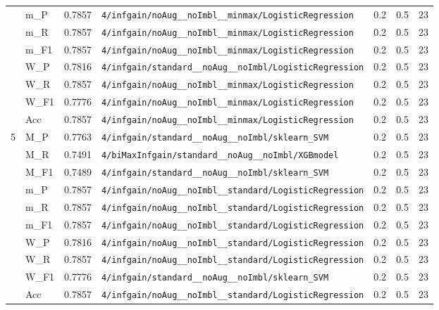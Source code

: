 \begin{table}[htbp]
\begin{tabular}{|c|l|c|>{\ttfamily\footnotesize}p{7.2cm}|c|c|c|}
 & m\_P & 0.7857 & \texttt{4/infgain/noAug\_\_noImbl\_\_minmax/LogisticRegression} & 0.2 & 0.5  & 23 \\ 
 & m\_R & 0.7857 & \texttt{4/infgain/noAug\_\_noImbl\_\_minmax/LogisticRegression} & 0.2 & 0.5  & 23 \\ 
 & m\_F1 & 0.7857 & \texttt{4/infgain/noAug\_\_noImbl\_\_minmax/LogisticRegression} & 0.2 & 0.5  & 23 \\ 
 & W\_P & 0.7816 & \texttt{4/infgain/standard\_\_noAug\_\_noImbl/LogisticRegression} & 0.2 & 0.5  & 23 \\ 
 & W\_R & 0.7857 & \texttt{4/infgain/noAug\_\_noImbl\_\_minmax/LogisticRegression} & 0.2 & 0.5  & 23 \\ 
 & W\_F1 & 0.7776 & \texttt{4/infgain/noAug\_\_noImbl\_\_minmax/LogisticRegression} & 0.2 & 0.5  & 23 \\ 
 & Acc & 0.7857 & \texttt{4/infgain/noAug\_\_noImbl\_\_minmax/LogisticRegression} & 0.2 & 0.5  & 23 \\ 
\hline
\multirow{10}{*}{5} & M\_P & 0.7763 & \texttt{4/infgain/standard\_\_noAug\_\_noImbl/sklearn\_SVM} & 0.2 & 0.5  & 23 \\ 
 & M\_R & 0.7491 & \texttt{4/biMaxInfgain/standard\_\_noAug\_\_noImbl/XGBmodel} & 0.2 & 0.5  & 23 \\ 
 & M\_F1 & 0.7489 & \texttt{4/infgain/standard\_\_noAug\_\_noImbl/sklearn\_SVM} & 0.2 & 0.5  & 23 \\ 
 & m\_P & 0.7857 & \texttt{4/infgain/noAug\_\_noImbl\_\_standard/LogisticRegression} & 0.2 & 0.5  & 23 \\ 
 & m\_R & 0.7857 & \texttt{4/infgain/noAug\_\_noImbl\_\_standard/LogisticRegression} & 0.2 & 0.5  & 23 \\ 
 & m\_F1 & 0.7857 & \texttt{4/infgain/noAug\_\_noImbl\_\_standard/LogisticRegression} & 0.2 & 0.5  & 23 \\ 
 & W\_P & 0.7816 & \texttt{4/infgain/noAug\_\_noImbl\_\_standard/LogisticRegression} & 0.2 & 0.5  & 23 \\ 
 & W\_R & 0.7857 & \texttt{4/infgain/noAug\_\_noImbl\_\_standard/LogisticRegression} & 0.2 & 0.5  & 23 \\ 
 & W\_F1 & 0.7776 & \texttt{4/infgain/standard\_\_noAug\_\_noImbl/sklearn\_SVM} & 0.2 & 0.5  & 23 \\ 
 & Acc & 0.7857 & \texttt{4/infgain/noAug\_\_noImbl\_\_standard/LogisticRegression} & 0.2 & 0.5  & 23 \\ 
\hline
\end{tabular}
\end{table}